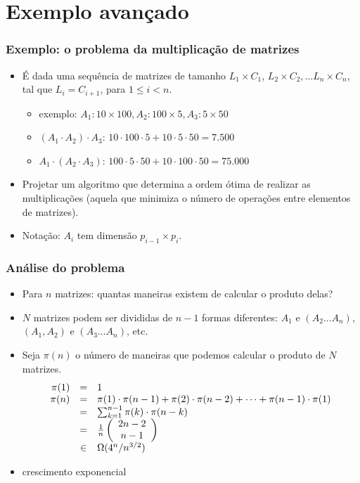 \documentclass{beamer}
\begin{document}
\section{Exemplo avançado}

\begin{frame}
\frametitle{Exemplo: o problema da multiplicação de matrizes}

\begin{itemize}
\item É dada uma sequência de matrizes de tamanho $L_1 \times C_1$, $L_2 \times
  C_2, \ldots L_n \times C_n$, tal que $L_i = C_{i+1}$, para $1 \le i < n$.

\begin{itemize}
\item exemplo: $A_1: 10 \times 100, A_2: 100 \times 5, A_3: 5 \times 50$
\item $(A_1 \cdot A_2) \cdot A_3$: $10 \cdot 100 \cdot 5 + 10 \cdot 5 \cdot 50 = 7.500$
\item $A_1 \cdot (A_2 \cdot A_3)$: $100 \cdot 5 \cdot 50 + 10 \cdot 100 \cdot 50 = 75.000$
\end{itemize}
\item Projetar um algoritmo que determina a ordem ótima de realizar as
  multiplicações (aquela que minimiza o número de operações entre elementos de
  matrizes).
\item Notação: $A_i$ tem dimensão $p_{i-1} \times p_i$.
\end{itemize}
\end{frame}

\begin{frame}
\frametitle{Análise do problema}

\begin{itemize}
\item Para $n$ matrizes: quantas maneiras existem de calcular o produto delas?
\item $N$ matrizes podem ser divididas de $n-1$ formas diferentes:
$A_1$ e $(A_2 \ldots A_n)$, $(A_1, A_2)$ e $(A_3 \ldots A_n)$, etc.
\item Seja $\pi(n)$ o número de maneiras que podemos calcular o produto de $N$ matrizes.
$$
  \begin{array}[t]{rcl}
    \pi(1) & = & 1 \\
    \pi(n) & = & \pi(1) \cdot \pi(n-1) + \pi(2) \cdot \pi(n-2) + \cdots + \pi(n-1) \cdot \pi(1) \\
    & = & \sum_{k=1}^{n-1} \pi(k) \cdot \pi(n-k) \\
    & = & \frac{1}{n}\left( \begin{array}{c} 2n-2 \\ n-1 \end{array} \right) \\
    & \in & \Omega(4^n / n^{3/2})
  \end{array}
$$
\item crescimento \alert{exponencial}
\end{itemize}

\end{frame}
\end{document}
